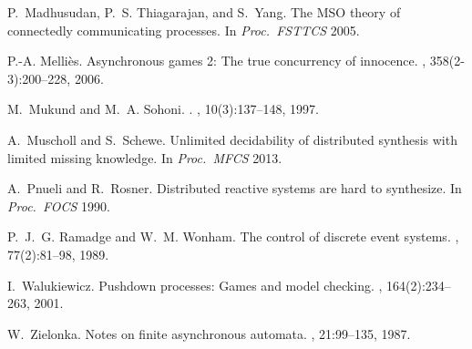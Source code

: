 \documentclass[10pt,a4paper]{article}
\begin{document}
\begin{thebibliography}{10}
P.~Madhusudan, P.~S. Thiagarajan, and S.~Yang.
\newblock The {MSO} theory of connectedly communicating processes.
\newblock In {\em Proc.~FSTTCS} 2005.

P.-A. Melli\`es.
\newblock Asynchronous games 2: {T}he true concurrency of innocence.
, 358(2-3):200--228, 2006.


M.~Mukund and M.~A. Sohoni.
.
, 10(3):137--148, 1997.

A.~Muscholl and S.~Schewe.
\newblock Unlimited decidability of distributed synthesis with limited missing
  knowledge.
\newblock In {\em Proc.~MFCS} 2013.

A.~Pnueli and R.~Rosner.
\newblock Distributed reactive systems are hard to synthesize.
\newblock In {\em Proc.~FOCS} 1990.

P.~J.~G. Ramadge and W.~M. Wonham.
\newblock The control of discrete event systems.
, 77(2):81--98, 1989.

I.~Walukiewicz.
\newblock Pushdown processes: Games and model checking.
, 164(2):234--263, 2001.

W.~Zielonka.
\newblock Notes on finite asynchronous automata.
, 21:99--135,
  1987.

\end{thebibliography}

\newpage
\end{document}

